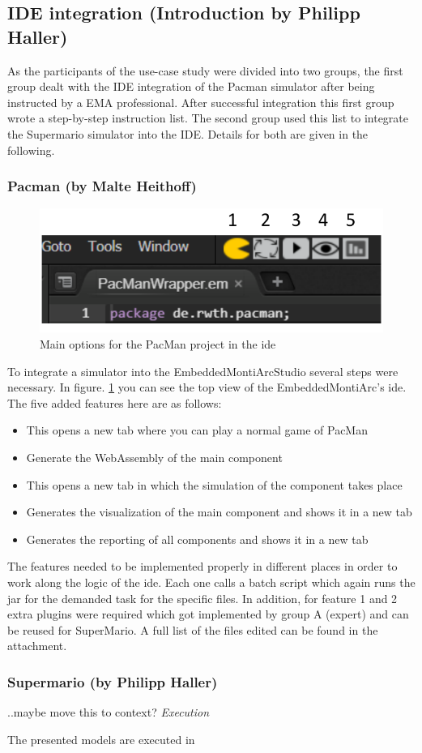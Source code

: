 \subsection{IDE integration (Introduction by Philipp Haller)}

As the participants of the use-case study were divided into two groups, the first group dealt with the IDE integration of the Pacman simulator after being instructed by a EMA professional.
After successful integration this first group wrote a step-by-step instruction list. The second group used this list to integrate the Supermario simulator into the IDE. Details for both are given in the following.

\subsubsection{Pacman (by Malte Heithoff)}
\begin{figure}
	\label{fig:idePacmanTop}
	\centering
	\includegraphics[scale=0.55]{pictures/IDE-PacMan-Top.pdf}
	\caption{Main options for the PacMan project in the ide}
\end{figure}
To integrate a simulator into the EmbeddedMontiArcStudio several steps were necessary. In figure. \ref{fig:idePacmanTop} you can see the top view of the EmbeddedMontiArc's ide. The five added features here are as follows:
\begin{itemize}
	\item[1.] This opens a new tab where you can play a normal game of PacMan
	\item[2.] Generate the WebAssembly of the main component
	\item[3.] This opens a new tab in which the simulation of the component takes place
	\item[4.] Generates the visualization of the main component and shows it in a new tab
	\item[5.] Generates the reporting of all components and shows it in a new tab
\end{itemize}
The features needed to be implemented properly in different places in order to work along the logic of the ide. Each one calls a batch script which again runs the jar for the demanded task for the specific files. In addition, for feature 1 and 2 extra plugins were required which got implemented by group A (expert) and can be reused for SuperMario.
A full list of the files edited can be found in the attachment.



\subsubsection{Supermario (by Philipp Haller)}
..maybe move this to context?
\emph{Execution}

The presented models are executed in